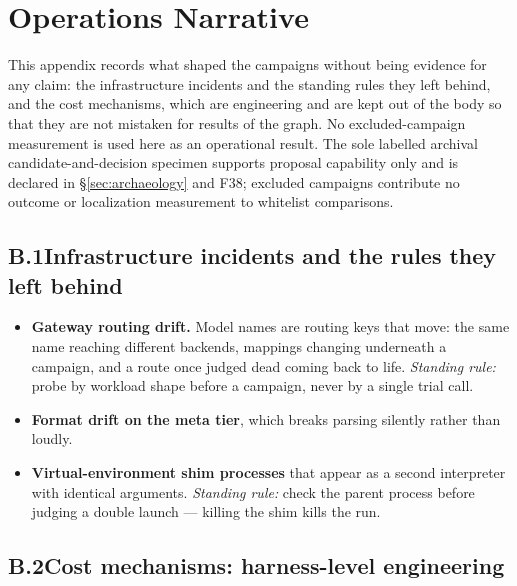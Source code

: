 \chapter{Operations Narrative}
\label{app:ops}

This appendix records what shaped the campaigns without being evidence
for any claim: the infrastructure incidents and the standing rules they
left behind, and the cost mechanisms, which are engineering and are kept
out of the body so that they are not mistaken for results of the graph.
No excluded-campaign measurement is used here as an operational result.
The sole labelled archival candidate-and-decision specimen supports proposal
capability only and is declared in \S\ref{sec:archaeology} and F38; excluded
campaigns contribute no outcome or localization measurement to whitelist
comparisons.

\section*{B.1\quad Infrastructure incidents and the rules they left behind}

\begin{itemize}
  \item \textbf{Gateway routing drift.} Model names are routing keys that
        move: the same name reaching different backends, mappings changing
        underneath a campaign, and a route once judged dead coming back to
        life. \emph{Standing rule:} probe by workload shape before a
        campaign, never by a single trial call.
  \item \textbf{Format drift on the meta tier}, which breaks parsing
        silently rather than loudly.
  \item \textbf{Virtual-environment shim processes} that appear as a second
        interpreter with identical arguments. \emph{Standing rule:} check
        the parent process before judging a double launch --- killing the
        shim kills the run.
\end{itemize}

\section*{B.2\quad Cost mechanisms: harness-level engineering}
\label{app:cost}

